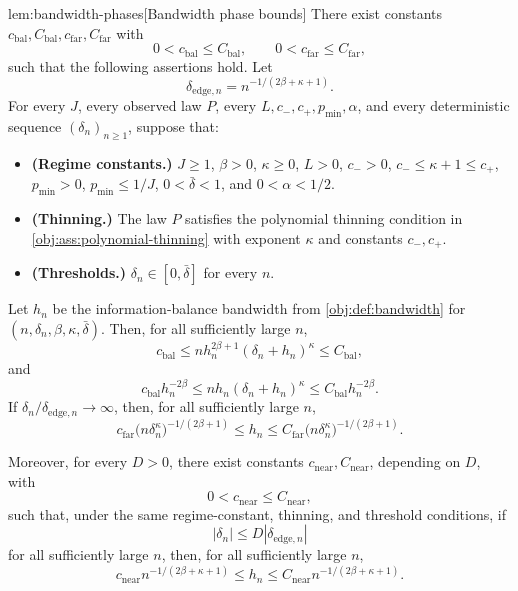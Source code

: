 \documentclass[11pt]{article}
\begin{document}
\begin{lemmav}{lem:bandwidth-phases}[Bandwidth phase bounds]
There exist constants \(c_{\mathrm{bal}},C_{\mathrm{bal}},c_{\mathrm{far}},C_{\mathrm{far}}\) with
\[
0<c_{\mathrm{bal}}\le C_{\mathrm{bal}},
\qquad
0<c_{\mathrm{far}}\le C_{\mathrm{far}},
\]
such that the following assertions hold.  Let
\[
\delta_{\mathrm{edge},n}
=
n^{-1/(2\beta+\kappa+1)} .
\]
For every \(J\), every observed law \(P\), every \(L,c_-,c_+,p_{\min},\alpha\), and every deterministic sequence \((\delta_n)_{n\ge1}\), suppose that:
\begin{itemize}
\item \textbf{(Regime constants.)} \(J\ge1\), \(\beta>0\), \(\kappa\ge0\), \(L>0\), \(c_->0\), \(c_-\le \kappa+1\le c_+\), \(p_{\min}>0\), \(p_{\min}\le 1/J\), \(0<\bar\delta<1\), and \(0<\alpha<1/2\).
\item \textbf{(Thinning.)} The law \(P\) satisfies the polynomial thinning condition in \cref{obj:ass:polynomial-thinning} with exponent \(\kappa\) and constants \(c_-,c_+\).
\item \textbf{(Thresholds.)} \(\delta_n\in[0,\bar\delta]\) for every \(n\).
\end{itemize}
Let \(h_n\) be the information-balance bandwidth from \cref{obj:def:bandwidth} for \((n,\delta_n,\beta,\kappa,\bar\delta)\).  Then, for all sufficiently large \(n\),
\[
c_{\mathrm{bal}}
\le
n h_n^{2\beta+1}(\delta_n+h_n)^\kappa
\le
C_{\mathrm{bal}},
\]
and
\[
c_{\mathrm{bal}}h_n^{-2\beta}
\le
n h_n(\delta_n+h_n)^\kappa
\le
C_{\mathrm{bal}}h_n^{-2\beta}.
\]
If \(\delta_n/\delta_{\mathrm{edge},n}\to\infty\), then, for all sufficiently large \(n\),
\[
c_{\mathrm{far}}\bigl(n\delta_n^\kappa\bigr)^{-1/(2\beta+1)}
\le
h_n
\le
C_{\mathrm{far}}\bigl(n\delta_n^\kappa\bigr)^{-1/(2\beta+1)} .
\]

Moreover, for every \(D>0\), there exist constants \(c_{\mathrm{near}},C_{\mathrm{near}}\), depending on \(D\), with
\[
0<c_{\mathrm{near}}\le C_{\mathrm{near}},
\]
such that, under the same regime-constant, thinning, and threshold conditions, if
\[
|\delta_n|\le D|\delta_{\mathrm{edge},n}|
\]
for all sufficiently large \(n\), then, for all sufficiently large \(n\),
\[
c_{\mathrm{near}}n^{-1/(2\beta+\kappa+1)}
\le
h_n
\le
C_{\mathrm{near}}n^{-1/(2\beta+\kappa+1)} .
\]
\end{lemmav}
\end{document}
